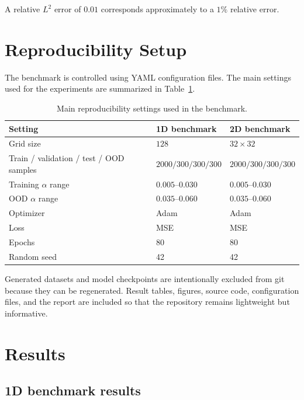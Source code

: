 \documentclass[11pt,a4paper]{article}
\begin{document}
A relative \(L^2\) error of \(0.01\) corresponds approximately to a \(1\%\) relative error.

\section{Reproducibility Setup}

The benchmark is controlled using YAML configuration files. The main settings used for the experiments are summarized in Table~\ref{tab:reproducibility}.

\begin{table}[H]
    \centering
    \caption{Main reproducibility settings used in the benchmark.}
    \label{tab:reproducibility}
    \begin{tabular}{lll}
        \toprule
        Setting & 1D benchmark & 2D benchmark \\
        \midrule
        Grid size & \(128\) & \(32 \times 32\) \\
        Train / validation / test / OOD samples & \(2000/300/300/300\) & \(2000/300/300/300\) \\
        Training \(\alpha\) range & \(0.005\)--\(0.030\) & \(0.005\)--\(0.030\) \\
        OOD \(\alpha\) range & \(0.035\)--\(0.060\) & \(0.035\)--\(0.060\) \\
        Optimizer & Adam & Adam \\
        Loss & MSE & MSE \\
        Epochs & 80 & 80 \\
        Random seed & 42 & 42 \\
        \bottomrule
    \end{tabular}
\end{table}

Generated datasets and model checkpoints are intentionally excluded from git because they can be regenerated. Result tables, figures, source code, configuration files, and the report are included so that the repository remains lightweight but informative.

\section{Results}

\subsection{1D benchmark results}
\end{document}
